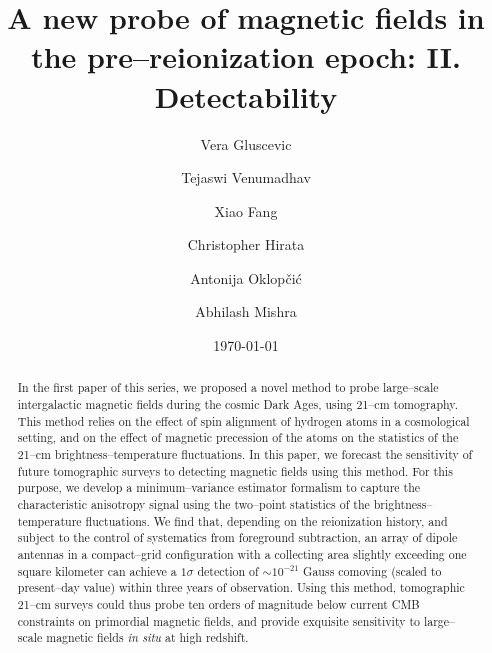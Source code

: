 \documentclass[aps,prd,twocolumn,floatfix,showpacs,superscriptaddress,nofootinbib]{revtex4-1}
\begin{document}
\widetext    
\title{A new probe of magnetic fields in the pre--reionization epoch: II. Detectability}
\author{Vera Gluscevic}
\author{Tejaswi Venumadhav}
\author{Xiao Fang}
\author{Christopher Hirata}
\author{Antonija Oklop\v ci\' c}
\author{Abhilash Mishra} 
\date{\today}  
    
 
\begin{abstract} 
In the first paper of this series, we proposed a novel method to probe large--scale intergalactic magnetic fields during the cosmic Dark Ages, using 21--cm tomography. This method relies on the effect of spin alignment of hydrogen atoms in a cosmological setting, and on the effect of magnetic precession of the atoms on the statistics of the 21--cm brightness--temperature fluctuations. In this paper, we forecast the sensitivity of future tomographic surveys to detecting magnetic fields using this method. For this purpose, we develop a minimum--variance estimator formalism to capture the characteristic anisotropy signal using the two--point statistics of the brightness--temperature fluctuations. We find that, depending on the reionization history, and subject to the control of systematics from foreground subtraction, an array of dipole antennas in a compact--grid configuration with a collecting area slightly exceeding one square kilometer can achieve a $1\sigma$ detection of $\sim$$10^{-21}$ Gauss comoving (scaled to present--day value) within three years of observation. Using this method, tomographic 21--cm surveys could thus probe ten orders of magnitude below current CMB constraints on primordial magnetic fields, and provide exquisite sensitivity to large--scale magnetic fields \textit{in situ} at high redshift. 
\end{abstract} 
        
\pacs{} 
\maketitle     


\vspace{-12pt}





  
\appendix 

\label{app:Vrms} 

\label{app:lensing}

\label{app:fesc}



\end{document}
